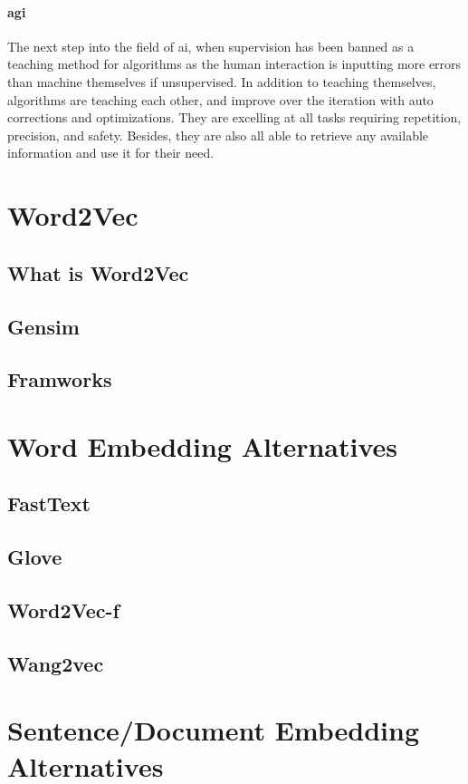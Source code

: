 \paragraph{\gls{agi}}
The next step into the field of \gls{ai}, when supervision has been banned as a teaching method for algorithms as the human interaction is inputting more errors than machine themselves if unsupervised. In addition to teaching themselves, algorithms are teaching each other, and improve over the iteration with auto corrections and optimizations. They are excelling at all tasks requiring repetition, precision, and safety. Besides, they are also all able to retrieve any available information and use it for their need. 

\section{Word2Vec}
\subsection{What is Word2Vec}
\subsection{Gensim}
\subsection{Framworks}


\section{Word Embedding Alternatives}
\subsection{FastText}
\subsection{Glove}
\subsection{Word2Vec-f}
\subsection{Wang2vec}


\section{Sentence/Document Embedding Alternatives}
